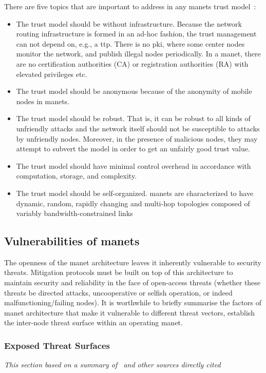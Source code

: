 There are five topics that are important to address in any \glspl{manet} trust model~\cite{Kamvar2003}:
%
\begin{itemize}
  \item The trust model should be without infrastructure.
    Because the network routing infrastructure is formed in an ad-hoc fashion, the trust management can not depend on, e.g., a \acrfull{ttp}.
    There is no \gls{pki}, where some center nodes monitor the network, and publish illegal nodes periodically.
    In a \gls{manet}, there are no certification authorities (CA) or registration authorities (RA) with elevated privileges etc.
  \item The trust model should be anonymous because of the anonymity of mobile nodes in \glspl{manet}. %
  \item The trust model should be robust.
    That is, it can be robust to all kinds of unfriendly attacks and the network itself should not be susceptible to attacks by unfriendly nodes.
    Moreover, in the presence of malicious nodes, they may attempt to subvert the model in order to get an unfairly good trust value.
  \item The trust model should have minimal control overhead in accordance with computation, storage, and complexity.
  \item The trust model should be self-organized.
    \glspl{manet} are characterized to have dynamic, random, rapidly changing and multi-hop topologies composed of variably bandwidth-constrained links
\end{itemize}
%

\subsection{Vulnerabilities of \glspl{manet}}

The openness of the \gls{manet} architecture leaves it inherently vulnerable to security threats. 
Mitigation protocols must be built on top of this architecture to maintain security and reliability in the face of open-access threats (whether these threats be directed attacks, uncooperative or selfish operation, or indeed malfunctioning/failing nodes).
It is worthwhile to briefly summarise the factors of \gls{manet} architecture that make it vulnerable to different threat vectors, establish the inter-node threat surface within an operating \gls{manet}.

\subsubsection{Exposed Threat Surfaces}
\emph{This section based on a summary of~\citet{csen2010security} and other sources directly cited}

